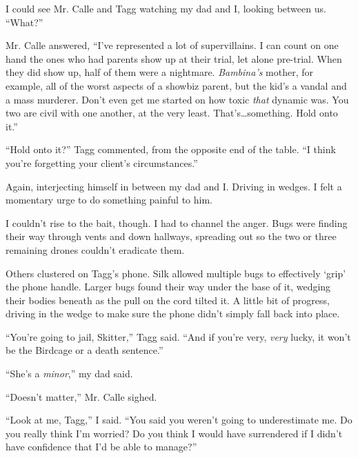 I could see Mr. Calle and Tagg watching my dad and I, looking between us.  ``What?''



Mr. Calle answered, ``I've represented a lot of supervillains.  I can count on one hand the ones who had parents show up at their trial, let alone pre-trial.  When they did show up, half of them were a nightmare.  \emph{Bambina's} mother, for example, all of the worst aspects of a showbiz parent, but the kid's a vandal and a mass murderer.  Don't even get me started on how toxic \emph{that} dynamic was.  You two are civil with one another, at the very least.  That's\ldots something.  Hold onto it.''



``Hold onto it?'' Tagg commented, from the opposite end of the table.  ``I think you're forgetting your client's circumstances.''



Again, interjecting himself in between my dad and I.  Driving in wedges.  I felt a momentary urge to do something painful to him.



I couldn't rise to the bait, though.  I had to channel the anger.  Bugs were finding their way through vents and down hallways, spreading out so the two or three remaining drones couldn't eradicate them.



Others clustered on Tagg's phone.  Silk allowed multiple bugs to effectively `grip' the phone handle.  Larger bugs found their way under the base of it, wedging their bodies beneath as the pull on the cord tilted it.  A little bit of progress, driving in the wedge to make sure the phone didn't simply fall back into place.



``You're going to jail, Skitter,'' Tagg said.  ``And if you're very, \emph{very} lucky, it won't be the Birdcage or a death sentence.''



``She's a \emph{minor},'' my dad said.



``Doesn't matter,'' Mr. Calle sighed.



``Look at me, Tagg,'' I said.  ``You said you weren't going to underestimate me.  Do you really think I'm worried?  Do you think I would have surrendered if I didn't have\emph{ }confidence that I'd be able to manage?''




